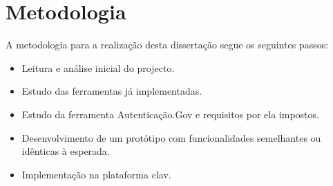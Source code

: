 \section{Metodologia}

A metodologia para a realização desta dissertação segue os seguintes passos:

\begin{itemize}
    \item Leitura e análise inicial do projecto.
    \item Estudo das ferramentas já implementadas.
    \item Estudo da ferramenta Autenticação.Gov e requisitos por ela impostos.
    \item Desenvolvimento de um protótipo com funcionalidades semelhantes ou idênticas à esperada.
    \item Implementação na plataforma \gls{clav}.
\end{itemize}